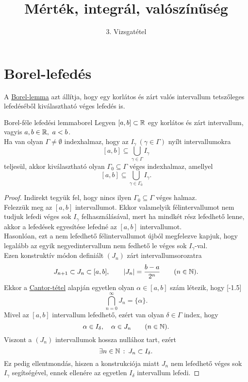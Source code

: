 \documentclass[
]{elteikthesis}[2024/04/26]
\title{Mérték, integrál, valószínűség} %
\subtitle{3. Vizsgatétel}
\begin{document}
	
	
	\section{Borel-lefedés}
	
	A \hyperref[lem:borel]{Borel-lemma} azt állítja, 
	hogy egy korlátos és zárt valós intervallum tetszőleges lefedéséből kiválasztható véges lefedés is.
	
	\begin{lemma}{Borel-féle lefedési lemma}{borel}
		Legyen \( [a, b] \subset \mathbb{R} \) egy korlátos és zárt intervallum, 
		vagyis \( a, b \in \mathbb{R}, \ a < b \).\\[6pt]
		Ha van olyan \( \Gamma \neq \emptyset \) indexhalmaz, hogy az
		\( I_\gamma \ (\gamma \in \Gamma) \) nyílt intervallumokra
		\[
			[a, b] \subseteq \bigcup_{\gamma \in \Gamma} I_\gamma
		\]
		teljesül, akkor kiválasztható olyan \( \Gamma_0 \subseteq \Gamma \) véges indexhalmaz, amellyel
		\[
			[a, b] \subseteq \bigcup_{\gamma \in \Gamma_0} I_\gamma.
		\]
	\end{lemma}	
	\begin{proof}
		Indirekt tegyük fel, hogy nincs ilyen \( \Gamma_0 \subseteq \Gamma \) véges halmaz.
		\\[6pt]
		Felezzük meg az \( [a, b] \) intervallumot. 
		Ekkor valamelyik félintervallumot nem tudjuk lefedi véges sok \( I_\gamma \) felhasználásával, 
		mert ha mindkét rész lefedhető lenne, 
		akkor a lefedések egyesítése lefedné az \( [a, b] \) intervallumot.\\[6pt]
		Hasonlóan, ezt a nem lefedhető félintervallumot újból megfelezve kapjuk, hogy
		legalább az egyik negyedintervallum nem fedhető le véges sok \( I_\gamma \)-val.\\[6pt]
		Ezen konstruktív módon definiált \( (J_n) \) zárt intervallumsorozatra
		\[
			J_{n + 1} \subset J_n \subset [a, b], \qquad
			\abs{J_n} = \frac{b - a}{2^n} \qquad (n \in \mathbb{N}).
		\]
		Ekkor a \hyperref[th:cantor]{Cantor-tétel} alapján egyetlen 
		olyan \( \alpha \in [a, b] \) szám létezik, hogy
		[-1.5\baselineskip]
		\[
			\bigcap_{n=0}^{\infty} J_n = \{ \alpha \}.
		\]
		Mivel az \( [a, b] \) intervallum lefedhető, ezért van olyan \( \delta \in \Gamma \) index, hogy
		\[
			\alpha \in I_\delta, \quad
			\alpha \in J_n \qquad (n \in \mathbb{N}).
		\]
		Viszont a \( (J_n) \) intervallumok hossza nullához tart, ezért
		\[
			\exists n \in \mathbb{N} \ \colon \, J_n \subset I_\delta.
		\]
		Ez pedig ellentmondás, hiszen a konstrukciója miatt \( J_n \) nem lefedhető 
		véges sok \( I_\gamma \) segítségével, 
		ennek ellenére az egyetlen \( I_\delta \) intervallum lefedi.
	\end{proof}
	
\end{document}
